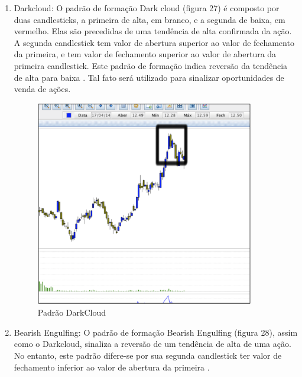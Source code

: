 \begin{description}
\begin{itemize}
\begin{enumerate}
\item Darkcloud:\newline
O padrão de formação Dark cloud (figura 27) é composto por duas candlesticks, a primeira de alta, em branco, e a segunda de baixa, em vermelho. Elas são precedidas de uma tendência de alta confirmada da ação. A segunda candlestick tem valor de abertura superior ao valor de fechamento da primeira, e tem valor de fechamento superior ao valor de abertura da primeira candlestick. Este padrão de formação indica reversão da tendência de alta para baixa \cite[p.61]{matsura2006}. Tal fato será utilizado para sinalizar oportunidades de venda de ações.

\begin{figure}[H]
\centering
\label{f27}
\includegraphics[width=0.9\textwidth]{figuras/f19}
\caption{Padrão DarkCloud}
\end{figure}
\FloatBarrier
\item Bearish Engulfing:\newline
O padrão de formação Bearish Engulfing (figura 28), assim como o Darkcloud, sinaliza a reversão de um tendência de alta de uma ação. No entanto, este padrão difere-se por sua segunda candlestick ter valor de fechamento inferior ao valor de abertura da primeira \cite[p. 38]{bigalow2010}.


\end{enumerate}
\end{itemize}
\end{description}
